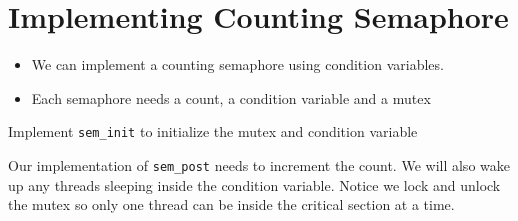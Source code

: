 \section{Implementing Counting
Semaphore}\label{implementing-counting-semaphore}

\begin{itemize}
\item
  We can implement a counting semaphore using condition variables.
\item
  Each semaphore needs a count, a condition variable and a mutex

\begin{Shaded}
\begin{Highlighting}[]
  
   
\end{Highlighting}
\end{Shaded}
\end{itemize}

Implement \texttt{sem\_init} to initialize the mutex and condition
variable

\begin{Shaded}
\begin{Highlighting}[]
   
   \NormalTok{; } \NormalTok{-}\NormalTok{;\}}

   \NormalTok{;}
\NormalTok{\}}
\end{Highlighting}
\end{Shaded}

Our implementation of \texttt{sem\_post} needs to increment the count.
We will also wake up any threads sleeping inside the condition variable.
Notice we lock and unlock the mutex so only one thread can be inside the
critical section at a time.

\begin{Shaded}
\begin{Highlighting}[]

\NormalTok{\}}
\end{Highlighting}
\end{Shaded}

